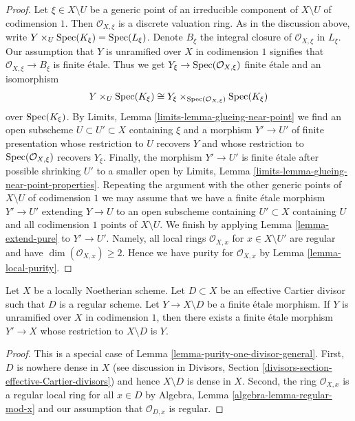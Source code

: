 \begin{proof}
Let $\xi \in X \setminus U$ be a generic point of an irreducible component
of $X \setminus U$ of codimension $1$. Then $\mathcal{O}_{X, \xi}$ is a
discrete valuation ring. As in the discussion above, write
$Y \times_U \mathop{\mathrm{Spec}}(K_\xi) = \mathop{\mathrm{Spec}}(L_\xi)$.
Denote $B_\xi$ the integral closure of $\mathcal{O}_{X, \xi}$ in
$L_\xi$. Our assumption that $Y$ is unramified over $X$ in codimension $1$
signifies that $\mathcal{O}_{X, \xi} \to B_\xi$ is finite \'etale.
Thus we get $Y_\xi \to \mathop{\mathrm{Spec}}(\mathcal{O}_{X, \xi})$ finite
\'etale and an isomorphism
$$
Y \times_U \mathop{\mathrm{Spec}}(K_\xi) \cong
Y_\xi \times_{\mathop{\mathrm{Spec}}(\mathcal{O}_{X, \xi})} \mathop{\mathrm{Spec}}(K_\xi)
$$
over $\mathop{\mathrm{Spec}}(K_\xi)$.
By Limits, Lemma \ref{limits-lemma-glueing-near-point}
we find an open subscheme $U \subset U' \subset X$
containing $\xi$ and a morphism $Y' \to U'$ of finite presentation
whose restriction to $U$ recovers $Y$ and
whose restriction to $\mathop{\mathrm{Spec}}(\mathcal{O}_{X, \xi})$ recovers $Y_\xi$.
Finally, the morphism $Y' \to U'$ is finite \'etale
after possible shrinking $U'$ to a smaller open by
Limits, Lemma \ref{limits-lemma-glueing-near-point-properties}.
Repeating the argument with the other generic points of
$X \setminus U$ of codimension $1$ we may assume that we have
a finite \'etale morphism $Y' \to U'$ extending $Y \to U$
to an open subscheme containing $U' \subset X$ containing $U$
and all codimension $1$ points of $X \setminus U$.
We finish by applying Lemma \ref{lemma-extend-pure}
to $Y' \to U'$. Namely, all local rings $\mathcal{O}_{X, x}$
for $x \in X \setminus U'$ are regular and
have $\dim(\mathcal{O}_{X, x}) \geq 2$. Hence we have
purity for $\mathcal{O}_{X, x}$ by Lemma \ref{lemma-local-purity}.
\end{proof}

\begin{lemma}
\label{lemma-purity-one-divisor}
Let $X$ be a locally Noetherian scheme. Let $D \subset X$
be an effective Cartier divisor such that $D$ is a regular scheme.
Let $Y \to X \setminus D$ be a finite \'etale morphism.
If $Y$ is unramified over $X$ in codimension $1$, then
there exists a finite \'etale morphism $Y' \to X$
whose restriction to $X \setminus D$ is $Y$.
\end{lemma}

\begin{proof}
This is a special case of Lemma \ref{lemma-purity-one-divisor-general}.
First, $D$ is nowhere dense in $X$ (see discussion in
Divisors, Section \ref{divisors-section-effective-Cartier-divisors})
and hence $X \setminus D$ is dense in $X$. Second, the ring
$\mathcal{O}_{X, x}$ is a regular local ring for all $x \in D$ by
Algebra, Lemma \ref{algebra-lemma-regular-mod-x}
and our assumption that $\mathcal{O}_{D, x}$ is regular.
\end{proof}


